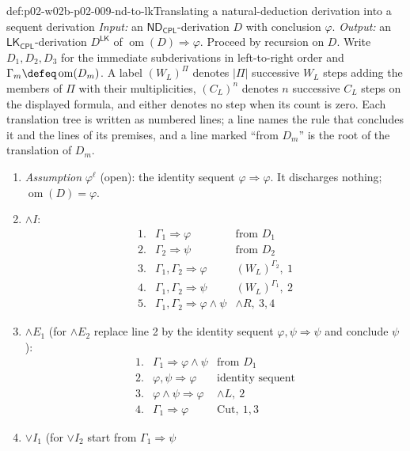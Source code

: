 \begin{hbmethod}{def:p02-w02b-p02-009-nd-to-lk}{Translating a natural-deduction derivation into a sequent derivation}
\emph{Input:} an \(\mathsf{ND}_{\mathsf{CPL}}\)-derivation \(D\) with
conclusion \(\varphi\).  \emph{Output:} an
\(\mathsf{LK}_{\mathsf{CPL}}\)-derivation \(D^{\mathsf{LK}}\) of
\(\operatorname{om}(D)\Rightarrow\varphi\).  Proceed by recursion on \(D\).
Write \(D_1,D_2,D_3\) for the immediate subderivations in left-to-right
order and \(\Gamma_m\defeq\operatorname{om}(D_m)\).  A label
\((W_L)^{\Pi}\) denotes \(|\Pi|\) successive \(W_L\) steps adding the members
of \(\Pi\) with their multiplicities, \((C_L)^{n}\) denotes \(n\) successive
\(C_L\) steps on the displayed formula, and either denotes no step when its
count is zero.  Each translation tree is written as numbered lines; a line
names the rule that concludes it and the lines of its premises, and a line
marked ``from \(D_m\)'' is the root of the translation of \(D_m\).
\begin{enumerate}
  \item \emph{Assumption} \(\varphi^{\ell}\) (open): the identity sequent
    \(\varphi\Rightarrow\varphi\).  It discharges nothing;
    \(\operatorname{om}(D)=\varphi\).
  \item \(\land I\):
    \[
    \begin{array}{rll}
    1.&\Gamma_1\Rightarrow\varphi&\text{from }D_1\\
    2.&\Gamma_2\Rightarrow\psi&\text{from }D_2\\
    3.&\Gamma_1,\Gamma_2\Rightarrow\varphi&(W_L)^{\Gamma_2},\ 1\\
    4.&\Gamma_1,\Gamma_2\Rightarrow\psi&(W_L)^{\Gamma_1},\ 2\\
    5.&\Gamma_1,\Gamma_2\Rightarrow\varphi\land\psi&\land R,\ 3,4
    \end{array}
    \]
  \item \(\land E_1\) (for \(\land E_2\) replace line 2 by the identity
    sequent \(\varphi,\psi\Rightarrow\psi\) and conclude \(\psi\)):
    \[
    \begin{array}{rll}
    1.&\Gamma_1\Rightarrow\varphi\land\psi&\text{from }D_1\\
    2.&\varphi,\psi\Rightarrow\varphi&\text{identity sequent}\\
    3.&\varphi\land\psi\Rightarrow\varphi&\land L,\ 2\\
    4.&\Gamma_1\Rightarrow\varphi&\mathrm{Cut},\ 1,3
    \end{array}
    \]
  \item \(\lor I_1\) (for \(\lor I_2\) start from \(\Gamma_1\Rightarrow\psi\)

\end{enumerate}
\end{hbmethod}
